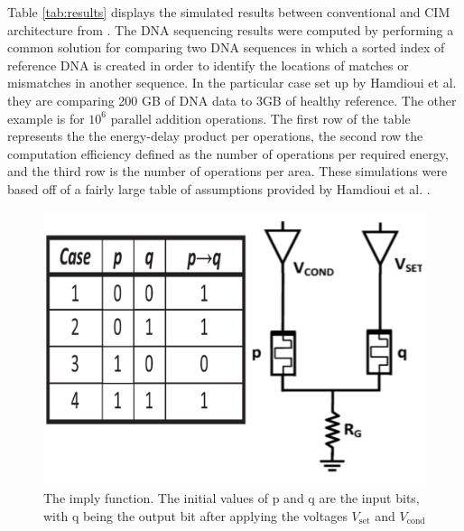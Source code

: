 \documentclass{sig-alternate}
\begin{document}
Table \ref{tab:results} displays the simulated results between conventional and CIM architecture from \cite{Hamdioui:2015:MBC:2755753.2757210}.  The DNA sequencing results were computed by performing a common solution for comparing two DNA sequences in which a sorted index of reference DNA is created in order to identify the locations of matches or mismatches in another sequence.  In the particular case set up by Hamdioui et al. they are comparing 200 GB of DNA data to 3GB of healthy reference. The other example is for $10^6$ parallel addition operations.  The first row of the table represents the the energy-delay product per operations, the second row the computation efficiency defined as the number of operations per required energy, and the third row is the number of operations per area. These simulations were based off of a fairly large table of assumptions provided by Hamdioui et al. \cite{Hamdioui:2015:MBC:2755753.2757210}.


\begin{figure}
  \includegraphics[scale=.28]{imply.pdf}
  \caption{The imply function.  The initial values of p and q are the input bits, with q being the output bit after applying the voltages $V_{\textrm{set}}$ and $V_{\textrm{cond}}$ }
  \label{fig:imply}
\end{figure}
\end{document}
